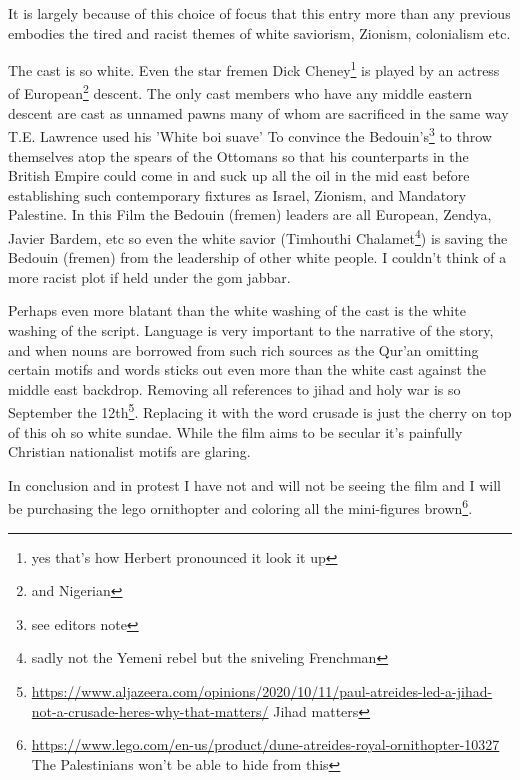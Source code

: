 \documentclass{article}
\begin{document}
 It is largely because of this choice of focus that this entry more than any previous embodies the tired and racist themes of white saviorism, Zionism, colonialism etc.

The cast is so white. Even the star fremen Dick Cheney\footnote{yes that's how Herbert pronounced it look it up} is played by an actress of European\footnote{and Nigerian} descent. The only cast members who have any middle eastern descent are cast as unnamed pawns many of whom are sacrificed in the same way T.E. Lawrence used his 'White boi suave' To convince the Bedouin's\footnote{see editors note} to throw themselves atop the spears of the Ottomans so that his counterparts in the British Empire could come in and suck up all the oil in the mid east before establishing such contemporary fixtures as Israel, Zionism, and Mandatory Palestine. In this Film the Bedouin (fremen) leaders are all European, Zendya, Javier Bardem, etc so even the white savior (Timhouthi Chalamet\footnote{sadly not the Yemeni rebel but the sniveling Frenchman}) is saving the Bedouin (fremen) from the leadership of other white people. I couldn't think of a more racist plot if held under the gom jabbar.

Perhaps even more blatant than the white washing of the cast is the white washing of the script. Language is very important to the narrative of the story, and when nouns are borrowed from such rich sources as the Qur'an omitting certain motifs and words sticks out even more than the white cast against the middle east backdrop. Removing all references to jihad and holy war is so September the 12th\footnote{\href{https://www.aljazeera.com/opinions/2020/10/11/paul-atreides-led-a-jihad-not-a-crusade-heres-why-that-matters/}{https://www.aljazeera.com/opinions/2020/10/11/paul-atreides-led-a-jihad-not-a-crusade-heres-why-that-matters/} Jihad matters}. Replacing it with the word crusade is just the cherry on top of this oh so white sundae. While the film aims to be secular it's painfully Christian nationalist motifs are glaring.

In conclusion and in protest I have not and will not be seeing the film and I will be purchasing the lego ornithopter and coloring all the mini-figures brown\footnote{\href{https://www.lego.com/en-us/product/dune-atreides-royal-ornithopter-10327}{https://www.lego.com/en-us/product/dune-atreides-royal-ornithopter-10327} The Palestinians won't be able to hide from this}.

\hfill \break

\noindent{}
\end{document}
